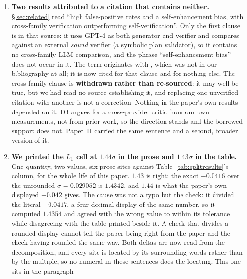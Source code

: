 \documentclass[11pt]{article}
\begin{document}
\begin{enumerate}
    whether a printed decimal is in the set of \emph{values} some check derives, and $0.042$ collides
    with this paper's own $-0.042$ headline while $0.105$ collides with a confidence bound in
    Table~\ref{tab:p0}. A wrong number tends to collide with a related one nearby, because
    nearby is where it was copied from.
  \item \textbf{Two results attributed to a citation that contains neither.} \S\ref{sec:related}
    read ``high false-positive rates \citep{valmeekam2023selfcritique} and a self-enhancement bias,
    with cross-family verification outperforming self-verification''. Only the first clause is in
    that source: it uses GPT-4 as both generator and verifier and compares against an external
    \emph{sound} verifier (a symbolic plan validator), so it contains no cross-family LLM
    comparison, and the phrase ``self-enhancement bias'' does not occur in it. The term originates
    with \citet{zheng2023judging}, which was not in our bibliography at all; it is now cited for
    that clause and for nothing else. The cross-family clause is \textbf{withdrawn rather than
    re-sourced}: it may well be true, but we had read no source establishing it, and replacing one
    unverified citation with another is not a correction. Nothing in the paper's own results
    depended on it: D3 argues for a cross-provider critic from our own measurements, not from
    prior work, so the direction stands and the borrowed support does not. Paper~II carried the
    same sentence and a second, broader version of it.
  \item \textbf{We printed the $L_1$ cell at $1.44\sigma$ in the prose and $1.43\sigma$ in the table.} One quantity, two values, six prose sites against
    Table~\ref{tab:splitresults}'s column, for the whole life of this paper. $1.43$ is right:
    the exact $-0.041\overline{6}$ over the unrounded $\sigma = 0.029052$ is $1.4342$, and $1.44$ is
    what the paper's own displayed $-0.042$ gives. The cause was not a typo but the check: it
    divided the literal $-0.0417$, a four-decimal display of the same number, so it computed
    $1.4354$ and agreed with the wrong value to within its tolerance while disagreeing with the table printed beside it. A check that divides a rounded display cannot tell the paper being
    right from the paper and the check having rounded the same way. Both deltas are now read from
    the decomposition, and every site is located by its surrounding words rather than by the
    multiple, so no numeral in these sentences does the locating. This one sits in the paragraph

\end{enumerate}
\end{document}
